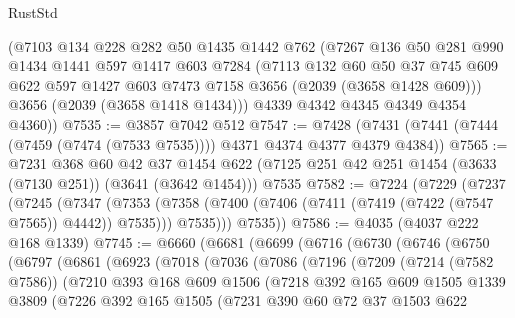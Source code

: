 \begin{lexlean}{RustStd}
\begin{coremodule}
      (@7103
        @134
        @228
        @282
        @50
        @1435
        @1442
        @762
        (@7267
          @136
          @50
          @281
          @990
          @1434
          @1441
          @597
          @1417
          @603
          @7284
          (@7113
            @132
            @60
            @50
            @37
            @745
            @609
            @622
            @597
            @1427
            @603
            @7473
            @7158
            @3656
            (@2039 (@3658 @1428 @609)))
          @3656
          (@2039 (@3658 @1418 @1434)))
        @4339
        @4342
        @4345
        @4349
        @4354
        @4360))
@7535 := @3857 @7042 @512
@7547 := @7428 (@7431 (@7441 (@7444 (@7459 (@7474 (@7533 @7535)))) @4371 @4374 @4377 @4379 @4384))
@7565 := @7231
    @368
    @60
    @42
    @37
    @1454
    @622
    (@7125 @251 @42 @251 @1454 (@3633 (@7130 @251)) (@3641 (@3642 @1454)))
    @7535
@7582 := @7224
    (@7229
      (@7237
        (@7245
          (@7347
            (@7353
              (@7358 (@7400 (@7406 (@7411 (@7419 (@7422 (@7547 @7565)) @4442)) @7535)))
              @7535)))
        @7535))
@7586 := @4035 (@4037 @222 @168 @1339)
@7745 := @6660
    (@6681
      (@6699
        (@6716
          (@6730
            (@6746
              (@6750
                (@6797
                  (@6861
                    (@6923
                      (@7018
                        (@7036
                          (@7086
                            (@7196
                              (@7209
                                (@7214 (@7582 @7586))
                                (@7210
                                  @393
                                  @168
                                  @609
                                  @1506
                                  (@7218
                                    @392
                                    @165
                                    @609
                                    @1505
                                    @1339
                                    @3809
                                    (@7226
                                      @392
                                      @165
                                      @1505
                                      (@7231
                                        @390
                                        @60
                                        @72
                                        @37
                                        @1503
                                        @622

\end{coremodule}
\end{lexlean}

